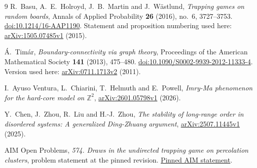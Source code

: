 \documentclass[11pt,a4paper]{article}
\newcommand{\Z}{\mathbb Z}
\numberwithin{equation}{section}
\begin{document}
\begin{thebibliography}{9}
R.~Basu, A.~E.~Holroyd, J.~B.~Martin and J.~W\"astlund,
\emph{Trapping games on random boards},
Annals of Applied Probability \textbf{26} (2016), no.~6, 3727--3753.
\href{https://doi.org/10.1214/16-AAP1190}{doi:10.1214/16-AAP1190}.
Statement and proposition numbering used here:
\href{https://arxiv.org/abs/1505.07485v1}{arXiv:1505.07485v1} (2015).

\'A.~Tim\'ar,
\emph{Boundary-connectivity via graph theory},
Proceedings of the American Mathematical Society \textbf{141}
(2013), 475--480.
\href{https://doi.org/10.1090/S0002-9939-2012-11333-4}
{doi:10.1090/S0002-9939-2012-11333-4}.
Version used here:
\href{https://arxiv.org/abs/0711.1713v2}{arXiv:0711.1713v2} (2011).

I.~Ayuso Ventura, L.~Chiarini, T.~Helmuth and E.~Powell,
\emph{Imry-Ma phenomenon for the hard-core model on $\Z^2$},
\href{https://arxiv.org/abs/2601.05798v1}{arXiv:2601.05798v1} (2026).

Y.~Chen, J.~Zhou, R.~Liu and H.-J.~Zhou,
\emph{The stability of long-range order in disordered systems:
A generalized Ding-Zhuang argument},
\href{https://arxiv.org/abs/2507.11445v1}{arXiv:2507.11445v1} (2025).

AIM Open Problems,
\emph{574. Draws in the undirected trapping game on percolation clusters},
problem statement at the pinned revision.
\href{https://github.com/MColbrook/AIM/blob/c9929805cece044705abaaebe1cebddac1ba11a6/problems/574-trap-draws-percolation.md}
{Pinned AIM statement}.
\end{thebibliography}
\end{document}
